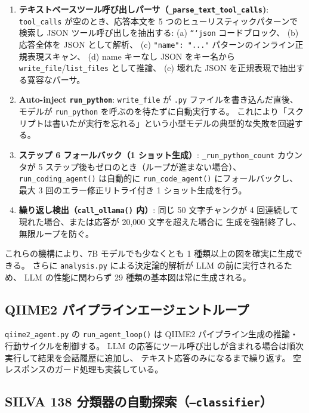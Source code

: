 \documentclass[12pt, a4paper]{article}
\begin{document}
\begin{enumerate}[leftmargin=2em]
  \item \textbf{テキストベースツール呼び出しパーサ（\texttt{\_parse\_text\_tool\_calls})}:
    \texttt{tool\_calls} が空のとき、応答本文を 5 つのヒューリスティックパターンで検索し
    JSON ツール呼び出しを抽出する:
    (a) \texttt{```json} コードブロック、
    (b) 応答全体を JSON として解析、
    (c) \texttt{"name": "..."} パターンのインライン正規表現スキャン、
    (d) name キーなし JSON をキー名から \texttt{write\_file}/\texttt{list\_files} として推論、
    (e) 壊れた JSON を正規表現で抽出する寛容なパーサ。

  \item \textbf{Auto-inject \texttt{run\_python}}:
    \texttt{write\_file} が \texttt{.py} ファイルを書き込んだ直後、
    モデルが \texttt{run\_python} を呼ぶのを待たずに自動実行する。
    これにより「スクリプトは書いたが実行を忘れる」という小型モデルの典型的な失敗を回避する。

  \item \textbf{ステップ 6 フォールバック（1 ショット生成）}:
    \texttt{\_run\_python\_count} カウンタが 5 ステップ後もゼロのとき（ループが進まない場合）、
    \texttt{run\_coding\_agent()} は自動的に \texttt{run\_code\_agent()} にフォールバックし、
    最大 3 回のエラー修正リトライ付き 1 ショット生成を行う。

  \item \textbf{繰り返し検出（\texttt{call\_ollama()} 内）}:
    同じ 50 文字チャンクが 4 回連続して現れた場合、または応答が 20,000 文字を超えた場合に
    生成を強制終了し、無限ループを防ぐ。
\end{enumerate}

これらの機構により、7B モデルでも少なくとも 1 種類以上の図を確実に生成できる。
さらに \texttt{analysis.py} による決定論的解析が LLM の前に実行されるため、
LLM の性能に関わらず 29 種類の基本図は常に生成される。

\subsection{QIIME2 パイプラインエージェントループ}

\texttt{qiime2\_agent.py} の \texttt{run\_agent\_loop()} は
QIIME2 パイプライン生成の推論・行動サイクルを制御する。
LLM の応答にツール呼び出しが含まれる場合は順次実行して結果を会話履歴に追加し、
テキスト応答のみになるまで繰り返す。
空レスポンスのガード処理も実装している。

\subsection{SILVA 138 分類器の自動探索（\texttt{--classifier}）}
\end{document}
